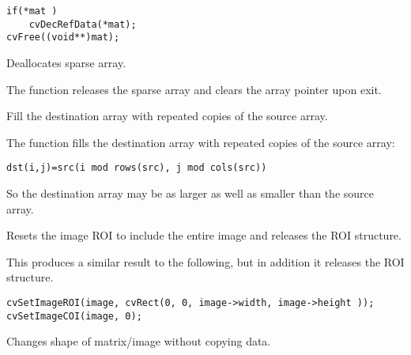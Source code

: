 \begin{lstlisting}
if(*mat )
    cvDecRefData(*mat);
cvFree((void**)mat);
\end{lstlisting}

Deallocates sparse array.


\begin{description}
\end{description}

The function releases the sparse array and clears the array pointer upon exit.

\fi

Fill the destination array with repeated copies of the source array.


\begin{description}
\end{description}

The function fills the destination array with repeated copies of the source array:

\begin{lstlisting}
dst(i,j)=src(i mod rows(src), j mod cols(src))
\end{lstlisting}

So the destination array may be as larger as well as smaller than the source array.

Resets the image ROI to include the entire image and releases the ROI structure.


\begin{description}
\end{description}

This produces a similar result to the following, but in addition it releases the ROI structure.

\begin{lstlisting}
cvSetImageROI(image, cvRect(0, 0, image->width, image->height ));
cvSetImageCOI(image, 0);
\end{lstlisting}


Changes shape of matrix/image without copying data.

